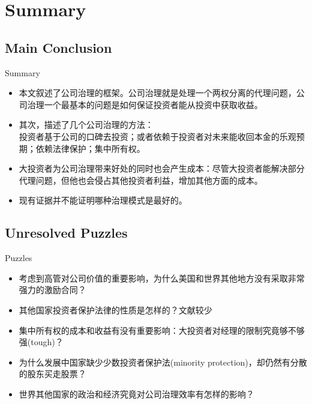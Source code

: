 \section{Summary}
\subsection{Main Conclusion}
\begin{frame}{Summary}
	\begin{itemize}
	\item 本文叙述了公司治理的框架。公司治理就是处理一个两权分离的代理问题，公司治理一个最基本的问题是如何保证投资者能从投资中获取收益。
	\item 其次，描述了几个公司治理的方法：\\
	投资者基于公司的口碑去投资；或者依赖于投资者对未来能收回本金的乐观预期；依赖法律保护；集中所有权。\\
	\item 大投资者为公司治理带来好处的同时也会产生成本：尽管大投资者能解决部分代理问题，但他也会侵占其他投资者利益，增加其他方面的成本。
	\item 现有证据并不能证明哪种治理模式是最好的。
	\end{itemize}

\end{frame}

\subsection{Unresolved Puzzles}
\begin{frame}{Puzzles}

	\begin{itemize}
	\item 考虑到高管对公司价值的重要影响，为什么美国和世界其他地方没有采取非常强力的激励合同？
	\item 其他国家投资者保护法律的性质是怎样的？文献较少
	\item 集中所有权的成本和收益有没有重要影响：大投资者对经理的限制究竟够不够强(tough)？
	\item 为什么发展中国家缺少少数投资者保护法(minority protection)，却仍然有分散的股东买走股票？
	\item 世界其他国家的政治和经济究竟对公司治理效率有怎样的影响？
	\end{itemize}

\end{frame}